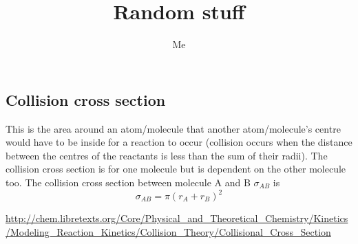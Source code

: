 \documentclass[11pt, oneside]{article}   	%
\title{Random stuff}
\author{Me}
\begin{document}
\maketitle

\subsection*{Collision cross section}
This is the area around an atom/molecule that another atom/molecule's centre would have to be inside for a reaction to occur (collision occurs when the distance between the centres of the reactants is less than the sum of their radii). The collision cross section is for one molecule but is dependent on the other molecule too.
The collision cross section between molecule A and B $\sigma_{AB}$ is 
\begin{equation}
\sigma_{AB} = \pi(r_A + r_B)^2
\end{equation}

\url{http://chem.libretexts.org/Core/Physical_and_Theoretical_Chemistry/Kinetics/Modeling_Reaction_Kinetics/Collision_Theory/Collisional_Cross_Section}

\cite{Weltmann2009}




\end{document}
